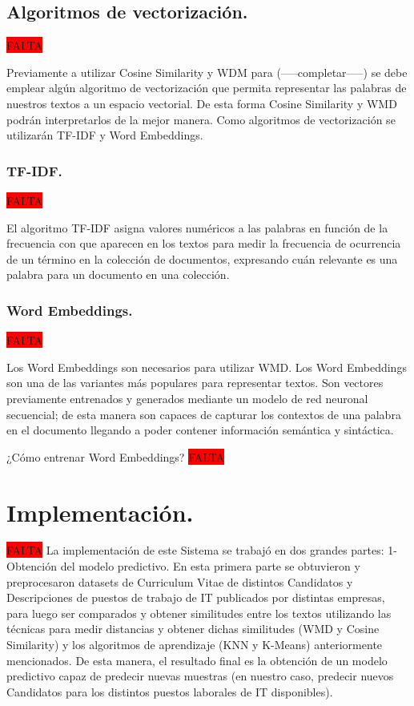 \documentclass[12pt,a4paper]{article}
\makeatletter
\renewcommand\paragraph{\@startsection{paragraph}{4}{\z@}
            {-2.5ex\@plus -1ex \@minus -.25ex}
            {1.25ex \@plus .25ex}
            {\normalfont\normalsize\bfseries}}
\makeatother
\begin{document}
\subsection{Algoritmos de vectorización.}
\colorbox{red}{FALTA}

Previamente a utilizar Cosine Similarity y WDM para (-----completar-----) se debe emplear algún algoritmo de vectorización que permita representar las palabras de nuestros textos a un espacio vectorial. De esta forma Cosine Similarity y WMD podrán interpretarlos de la mejor manera. 
Como algoritmos de vectorización se utilizarán TF-IDF y Word Embeddings.

\subsubsection{TF-IDF.}
\colorbox{red}{FALTA}

El algoritmo TF-IDF asigna valores numéricos a las palabras en función de la frecuencia con que aparecen en los textos para medir la frecuencia de ocurrencia de un término en la colección de documentos, expresando  cuán relevante es una palabra para un documento en una colección. 

\subsubsection{Word Embeddings.}
\colorbox{red}{FALTA}

Los Word Embeddings son necesarios para utilizar WMD.
Los Word Embeddings son una de las variantes más populares para representar textos.  Son vectores previamente entrenados y generados mediante un modelo de red neuronal secuencial; de esta manera son capaces de capturar los contextos de una palabra en el documento llegando a poder contener información semántica y sintáctica. 

\paragraph{¿Cómo entrenar Word Embeddings?}
\colorbox{red}{FALTA}

\section{Implementación.}
\colorbox{red}{FALTA}
La implementación de este Sistema se trabajó en dos grandes partes:
	1-Obtención del modelo predictivo. En esta primera parte se obtuvieron y preprocesaron datasets de Curriculum Vitae de distintos Candidatos y Descripciones de puestos de trabajo de IT publicados por distintas empresas, para luego ser comparados y obtener similitudes entre los textos utilizando las técnicas para medir distancias y obtener dichas similitudes (WMD y Cosine Similarity) y los algoritmos de aprendizaje (KNN y K-Means) anteriormente mencionados. De esta manera, el resultado final es la obtención de un modelo predictivo capaz de predecir nuevas muestras (en nuestro caso, predecir nuevos Candidatos para los distintos puestos laborales de IT disponibles).
		
\end{document}
